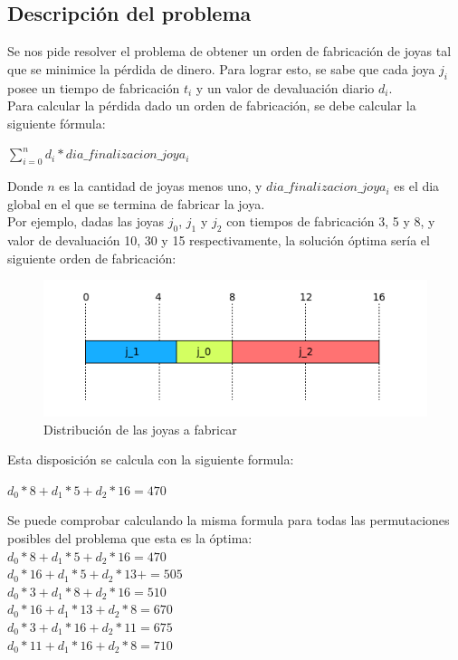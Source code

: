 \subsection{Descripci\'on del problema}

Se nos pide resolver el problema de obtener un orden de fabricaci\'on de joyas tal que se minimice la p\'erdida de dinero. Para lograr esto, se sabe que cada joya $j_{i}$ posee un tiempo de fabricaci\'on $t_{i}$ y un valor de devaluaci\'on diario $d_{i}$. \\

Para calcular la p\'erdida dado un orden de fabricaci\'on, se debe calcular la siguiente f\'ormula:

$\sum\limits_{i=0}^n d_{i}*dia\_finalizacion\_joya_{i}$

Donde $n$ es la cantidad de joyas menos uno, y $dia\_finalizacion\_joya_{i}$ es el dia global en el que se termina de fabricar la joya.\\

Por ejemplo, dadas las joyas $j_{0}$, $j_{1}$ y $j_{2}$ con tiempos de fabricaci\'on 3, 5 y 8, y valor de devaluaci\'on 10, 30 y 15 respectivamente, la soluci\'on \'optima ser\'ia el siguiente orden de fabricaci\'on:

\begin{center}
\begin{figure}[h]
\includegraphics[scale=0.7]{./img/ej2_chart1.png}
\caption{Distribuci\'on de las joyas a fabricar}
\end{figure}
\end{center}

Esta disposici\'on se calcula con la siguiente formula:

$d_{0}*8 + d_{1}*5 + d_{2}*16 = 470$

Se puede comprobar calculando la misma formula para todas las permutaciones posibles del problema que esta es la \'optima: \\

$d_{0}*8 + d_{1}*5 + d_{2}*16 = 470$ \\
$d_{0}*16 + d_{1}*5 + d_{2}*13 +  = 505$ \\
$d_{0}*3 + d_{1}*8 + d_{2}*16 = 510$ \\
$d_{0}*16 + d_{1}*13 + d_{2}*8 = 670$ \\
$d_{0}*3 + d_{1}*16 + d_{2}*11 = 675$ \\
$d_{0}*11 + d_{1}*16 + d_{2}*8 = 710$ \\


